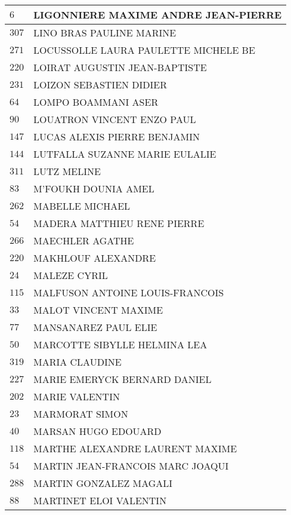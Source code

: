 \begin{xltabular}{\linewidth}{|l|X|}
    \hline
    $6$ & LIGONNIERE MAXIME ANDRE JEAN-PIERRE \\
    \hline
    $307$ & LINO BRAS PAULINE MARINE \\
    \hline
    $271$ & LOCUSSOLLE LAURA PAULETTE MICHELE BE \\
    \hline
    $220$ & LOIRAT AUGUSTIN JEAN-BAPTISTE \\
    \hline
    $231$ & LOIZON SEBASTIEN DIDIER \\
    \hline
    $64$ & LOMPO BOAMMANI ASER \\
    \hline
    $90$ & LOUATRON VINCENT ENZO PAUL \\
    \hline
    $147$ & LUCAS ALEXIS PIERRE BENJAMIN \\
    \hline
    $144$ & LUTFALLA SUZANNE MARIE EULALIE \\
    \hline
    $311$ & LUTZ MELINE \\
    \hline
    $83$ & M'FOUKH DOUNIA AMEL \\
    \hline
    $262$ & MABELLE MICHAEL \\
    \hline
    $54$ & MADERA MATTHIEU RENE PIERRE \\
    \hline
    $266$ & MAECHLER AGATHE \\
    \hline
    $220$ & MAKHLOUF ALEXANDRE \\
    \hline
    $24$ & MALEZE CYRIL \\
    \hline
    $115$ & MALFUSON ANTOINE LOUIS-FRANCOIS \\
    \hline
    $33$ & MALOT VINCENT MAXIME \\
    \hline
    $77$ & MANSANAREZ PAUL ELIE \\
    \hline
    $50$ & MARCOTTE SIBYLLE HELMINA LEA \\
    \hline
    $319$ & MARIA CLAUDINE \\
    \hline
    $227$ & MARIE EMERYCK BERNARD DANIEL \\
    \hline
    $202$ & MARIE VALENTIN \\
    \hline
    $23$ & MARMORAT SIMON \\
    \hline
    $40$ & MARSAN HUGO EDOUARD \\
    \hline
    $118$ & MARTHE ALEXANDRE LAURENT MAXIME \\
    \hline
    $54$ & MARTIN JEAN-FRANCOIS MARC JOAQUI \\
    \hline
    $288$ & MARTIN GONZALEZ MAGALI \\
    \hline
    $88$ & MARTINET ELOI VALENTIN \\
    \hline

\end{xltabular}
